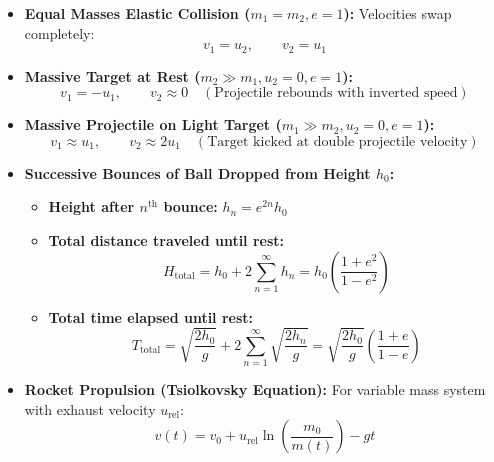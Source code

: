 \documentclass[10pt,twoside,openright]{book}
\begin{document}
\begin{usecasebox}
\begin{itemize}
  \item \textbf{Equal Masses Elastic Collision ($m_1 = m_2, e = 1$):} Velocities swap completely:
  \begin{equation}
    v_1 = u_2, \qquad v_2 = u_1
  \end{equation}
  \item \textbf{Massive Target at Rest ($m_2 \gg m_1, u_2 = 0, e = 1$):}
  \begin{equation}
    v_1 = -u_1, \qquad v_2 \approx 0 \quad (\text{Projectile rebounds with inverted speed})
  \end{equation}
  \item \textbf{Massive Projectile on Light Target ($m_1 \gg m_2, u_2 = 0, e = 1$):}
  \begin{equation}
    v_1 \approx u_1, \qquad v_2 \approx 2u_1 \quad (\text{Target kicked at double projectile velocity})
  \end{equation}
  \item \textbf{Successive Bounces of Ball Dropped from Height $h_0$:}
  \begin{itemize}[leftmargin=1.2em, itemsep=2pt]
    \item \textbf{Height after $n^{\text{th}}$ bounce:} $h_n = e^{2n}h_0$
    \item \textbf{Total distance traveled until rest:}
    \[
      H_{\text{total}} = h_0 + 2\sum_{n=1}^\infty h_n = h_0\left(\frac{1+e^2}{1-e^2}\right)
    \]
    \item \textbf{Total time elapsed until rest:}
    \[
      T_{\text{total}} = \sqrt{\frac{2h_0}{g}} + 2\sum_{n=1}^\infty \sqrt{\frac{2h_n}{g}} = \sqrt{\frac{2h_0}{g}}\left(\frac{1+e}{1-e}\right)
    \]
  \end{itemize}
  \item \textbf{Rocket Propulsion (Tsiolkovsky Equation):} For variable mass system with exhaust velocity $u_{\text{rel}}$:
  \begin{equation}
    v(t) = v_0 + u_{\text{rel}}\ln\left(\frac{m_0}{m(t)}\right) - gt
  \end{equation}
\end{itemize}
\end{usecasebox}
\end{document}
